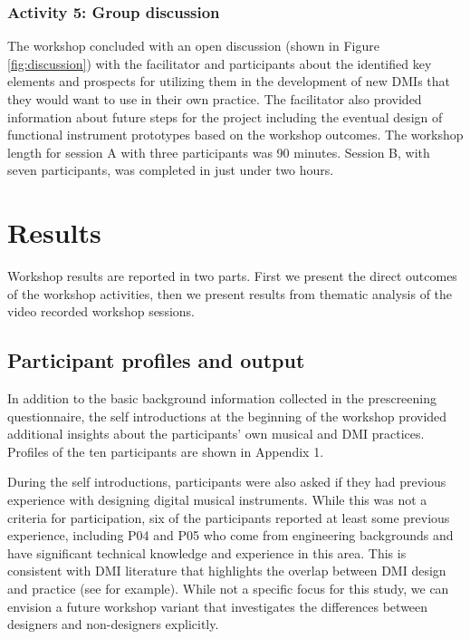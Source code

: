 \documentclass[letterpaper, 12pt]{article}
\begin{document}
\subsubsection{Activity 5: Group discussion}
\label{sec:activity-5-group-discussion}

The workshop concluded with an open discussion (shown in Figure \ref{fig:discussion}) with the facilitator and participants about the identified key elements and prospects for utilizing them in the development of new DMIs that they would want to use in their own practice. The facilitator also provided information about future steps for the project including the eventual design of functional instrument prototypes based on the workshop outcomes. The workshop length for session A with three participants was 90 minutes. Session B, with seven participants, was completed in just under two hours. 

\section{Results}
\label{sec:results}

Workshop results are reported in two parts. First we present the direct outcomes of the workshop activities, then we present results from thematic analysis of the video recorded workshop sessions. 

\subsection{Participant profiles and output}
\label{sec:participant-profiles-and-output}

In addition to the basic background information collected in the prescreening questionnaire, the self introductions at the beginning of the workshop provided additional insights about the participants' own musical and DMI practices. Profiles of the ten participants are shown in Appendix 1.

During the self introductions, participants were also asked if they had previous experience with designing digital musical instruments. While this was not a criteria for participation, six of the participants reported at least some previous experience, including P04 and P05 who come from engineering backgrounds and have significant technical knowledge and experience in this area. This is consistent with DMI literature that highlights the overlap between DMI design and practice (see \citet{Magnusson2008, Morreale2017, Morreale2018} for example). While not a specific focus for this study, we can envision a future workshop variant that investigates the differences between designers and non-designers explicitly.
\end{document}
